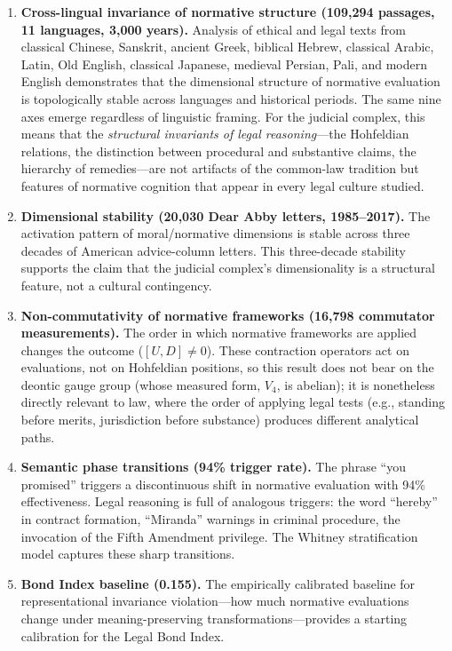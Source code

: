 \documentclass[12pt]{article}
\theoremstyle{definition}
\theoremstyle{remark}
\begin{document}
\begin{enumerate}
    \item \textbf{Cross-lingual invariance of normative structure (109,294 passages, 11 languages, 3,000 years).}  Analysis of ethical and legal texts from classical Chinese, Sanskrit, ancient Greek, biblical Hebrew, classical Arabic, Latin, Old English, classical Japanese, medieval Persian, Pali, and modern English demonstrates that the dimensional structure of normative evaluation is topologically stable across languages and historical periods.  The same nine axes emerge regardless of linguistic framing.  For the judicial complex, this means that the \emph{structural invariants of legal reasoning}---the Hohfeldian relations, the distinction between procedural and substantive claims, the hierarchy of remedies---are not artifacts of the common-law tradition but features of normative cognition that appear in every legal culture studied.

    \item \textbf{Dimensional stability (20,030 Dear Abby letters, 1985--2017).}  The activation pattern of moral/normative dimensions is stable across three decades of American advice-column letters.  This three-decade stability supports the claim that the judicial complex's dimensionality is a structural feature, not a cultural contingency.

    \item \textbf{Non-commutativity of normative frameworks (16,798 commutator measurements).}  The order in which normative frameworks are applied changes the outcome ($[U, D] \neq 0$).  These contraction operators act on evaluations, not on Hohfeldian positions, so this result does not bear on the deontic gauge group (whose measured form, $V_4$, is abelian); it is nonetheless directly relevant to law, where the order of applying legal tests (e.g., standing before merits, jurisdiction before substance) produces different analytical paths.

    \item \textbf{Semantic phase transitions (94\% trigger rate).}  The phrase ``you promised'' triggers a discontinuous shift in normative evaluation with 94\% effectiveness.  Legal reasoning is full of analogous triggers: the word ``hereby'' in contract formation, ``Miranda'' warnings in criminal procedure, the invocation of the Fifth Amendment privilege.  The Whitney stratification model captures these sharp transitions.

    \item \textbf{Bond Index baseline (0.155).}  The empirically calibrated baseline for representational invariance violation---how much normative evaluations change under meaning-preserving transformations---provides a starting calibration for the Legal Bond Index.
\end{enumerate}
\end{document}
